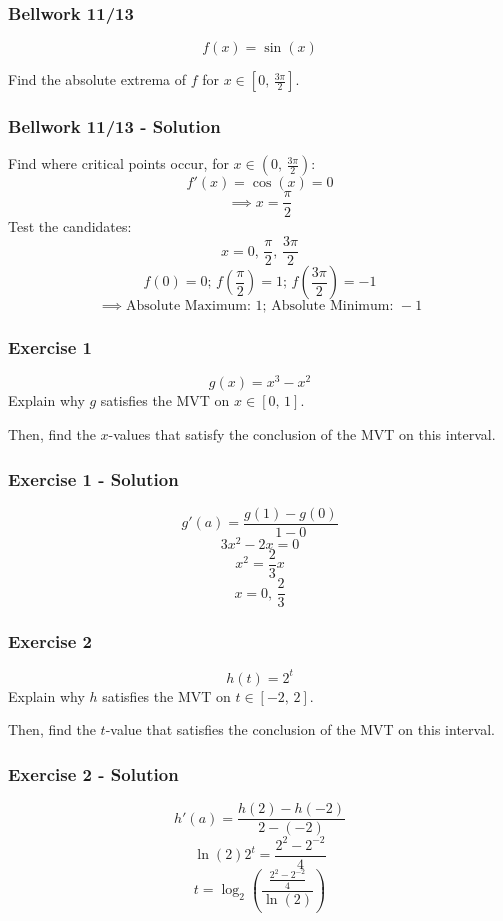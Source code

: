 \documentclass[12pt]{beamer}
\begin{document}
\begin{frame}
	\frametitle{Bellwork 11/13}
	\initclock

	\vfill
	\vfill
	\vfill
	\vfill
	\Large
	\[f(x)=\sin(x)\]
	\vfill
	\large
	\begin{center}
		Find the absolute extrema of $f$ for $x\in [0\text{, }\frac{3\pi}{2}]$.
	\end{center}
	\vfill
	\vfill
	\vfill
	\vfill

	\small
	\crono
\end{frame}
\begin{frame}
	\frametitle{Bellwork 11/13 - Solution}

	Find where critical points occur, for $x\in (0\text{, }\frac{3\pi}{2})$:
	\[f'(x)=\cos(x)=0\]
	\[\implies x=\frac{\pi}{2}\]
	Test the candidates:
	\[x=0\text{, }\frac{\pi}{2}\text{, }\frac{3\pi}{2}\]
	\[f(0)=0\text{; }f\left(\frac{\pi}{2}\right)=1\text{; }f\left(\frac{3\pi}{2}\right)=-1\]
	\[\implies \boxed{\text{Absolute Maximum: }1\text{; }\text{Absolute Minimum: }-1}\]
\end{frame}
\begin{frame}
	\frametitle{Exercise 1}

	\vfill
	\vfill
	\vfill
	\LARGE
	\[g(x)=x^3-x^2\]
	\vfill
	\vfill
	\vfill
	\large
	Explain why $g$ satisfies the MVT on $x\in[0\text{, }1]$.\par
	\vfill
	Then, find the $x$-values that satisfy the conclusion of the MVT on this interval.
	\vfill
	\vfill
	\vfill
	\vfill
	\vfill
	\vfill
\end{frame}
\begin{frame}
	\frametitle{Exercise 1 - Solution}

	\large
	\[g'(a)=\frac{g(1)-g(0)}{1-0}\]
	\[3x^2-2x=0\]
	\[x^2=\frac{2}{3}x\]
	\[\boxed{x=0\text{, }\frac{2}{3}}\]
\end{frame}
\begin{frame}
	\frametitle{Exercise 2}

	\vfill
	\vfill
	\vfill
	\LARGE
	\[h(t)=2^t\]
	\vfill
	\vfill
	\vfill
	\large
	Explain why $h$ satisfies the MVT on $t\in[-2\text{, }2]$.\par
	\vfill
	Then, find the $t$-value that satisfies the conclusion of the MVT on this interval.
	\vfill
	\vfill
	\vfill
	\vfill
	\vfill
	\vfill
\end{frame}
\begin{frame}
	\frametitle{Exercise 2 - Solution}

	\large
	\[h'(a)=\frac{h(2)-h(-2)}{2-(-2)}\]
	\[\ln(2)2^t=\frac{2^2-2^{-2}}{4}\]
	\[\boxed{t=\log_{2}\left(\frac{\frac{2^2-2^{-2}}{4}}{\ln(2)}\right)}\]
\end{frame}
\end{document}
